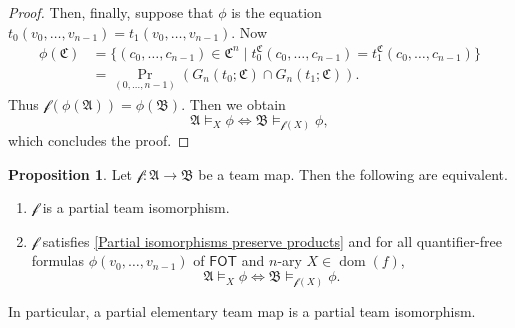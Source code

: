 \documentclass[a4paper]{amsart}
\theoremstyle{definition}
\newtheorem{proposition}[definition]{Proposition}
\theoremstyle{remark}
\newcommand{\A}{\mathcal{A}}
\newcommand{\B}{\mathcal{B}}
\newcommand{\C}{\mathcal{C}}
\DeclareMathOperator{\dom}{dom}
\newcommand\fot{\mathsf{FOT}}
\theoremstyle{definition}
\renewcommand{\A}{\mathfrak{A}}
\renewcommand{\B}{\mathfrak{B}}
\renewcommand{\C}{\mathfrak{C}}
\newcommand{\f}{\mathcal{f}}
\begin{document}
\begin{proof}
    Then, finally, suppose that $\phi$ is the equation $t_0(v_0,\dots,v_{n-1}) = t_1(v_0,\dots,v_{n-1})$. Now
    \begin{align*}
        \phi(\C) &= \{ (c_0,\dots,c_{n-1})\in\C^n \mid t_0^\C(c_0,\dots,c_{n-1}) = t_1^\C(c_0,\dots,c_{n-1}) \} \\
        &= \Pr_{(0,\dots,n-1)}(G_n(t_0;\C)\cap G_n(t_1;\C)).
    \end{align*}
    Thus $\f(\phi(\A)) = \phi(\B)$. Then we obtain
    \[
        \A\models_X\phi \iff \B\models_{\f(X)}\phi,
    \]
    which concludes the proof. \qedhere
\end{proof}

\begin{proposition}\label{Partial isomorphisms preserve quantifier-free formulas}
    Let $\f\colon\A\to\B$ be a team map. Then the following are equivalent.
    \begin{enumerate}
        \item $\f$ is a partial team isomorphism.

        \item $\f$ satisfies \ref{Partial isomorphisms preserve products} and for all quantifier-free formulas $\phi(v_0,\dots,v_{n-1})$ of $\fot$ and $n$-ary $X\in\dom(f)$,
        \[
            \A\models_X\phi \iff \B\models_{\f(X)}\phi.
        \]
    \end{enumerate}
    In particular, a partial elementary team map is a partial team isomorphism.
\end{proposition}
\end{document}
